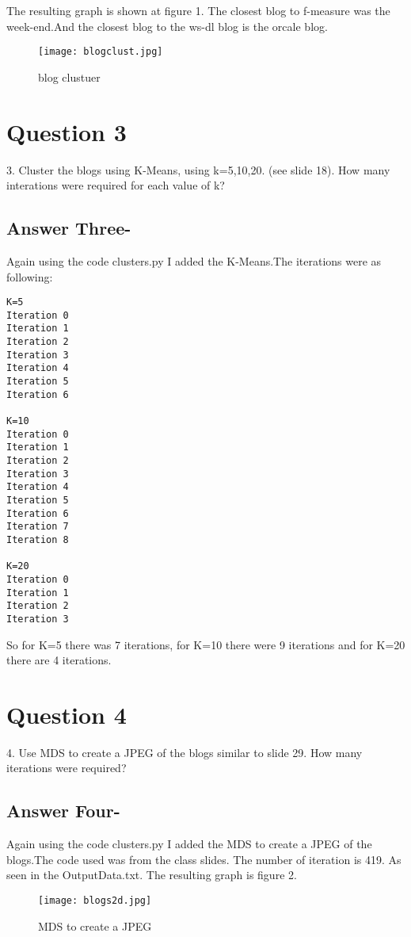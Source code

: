 \documentclass[letterpaper,11pt]{article}
\begin{document}
The resulting graph is shown at figure 1. The closest blog to f-measure was the week-end.And the closest blog to the ws-dl blog is the orcale blog.

\begin{figure}[!ht]
\centering
\texttt{[image: blogclust.jpg]}
\caption{blog clustuer}
\label{fig:blog clustuer}
\end{figure}

\newpage
\section*{Question 3}
3.  Cluster the blogs using K-Means, using k=5,10,20. (see slide 18).
How many interations were required for each value of k?
\newpage
\subsection*{Answer Three-}
Again using the code clusters.py I added the K-Means.The iterations were as following:
\begin{lstlisting}[frame=single]
K=5
Iteration 0
Iteration 1
Iteration 2
Iteration 3
Iteration 4
Iteration 5
Iteration 6

K=10
Iteration 0
Iteration 1
Iteration 2
Iteration 3
Iteration 4
Iteration 5
Iteration 6
Iteration 7
Iteration 8

K=20
Iteration 0
Iteration 1
Iteration 2
Iteration 3
\end{lstlisting}

So for K=5 there was 7 iterations, for K=10 there were 9 iterations and for K=20 there are 4 iterations.

\newpage
\section*{Question 4}
4.  Use MDS to create a JPEG of the blogs similar to slide 29. How many iterations were required?
\newpage
\subsection*{Answer Four-}
Again using the code clusters.py I added the MDS to create a JPEG of the blogs.The code used was from the class slides. The number of iteration is 419. As seen in the OutputData.txt. The resulting graph is figure 2.

\begin{figure}[!ht]
\centering
\texttt{[image: blogs2d.jpg]}
\caption{MDS to create a JPEG }
\label{fig:MDS to create a JPEG }
\end{figure}
\end{document}
